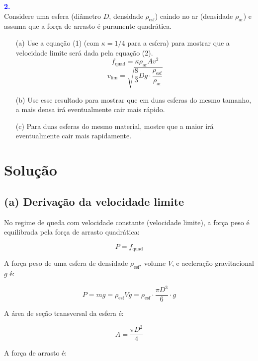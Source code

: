 \documentclass[a4paper,12pt]{article}
\begin{document}
\begin{flushleft}
\textbf{\textcolor{blue}{\Large \textbf{2.}}}\\
\noindent
Considere uma esfera (diâmetro \( D \), densidade \( \rho_{\text{esf}} \)) caindo no ar (densidade \( \rho_{\text{ar}} \)) e assuma que a força de arrasto é puramente quadrática.

\begin{enumerate}
    \item[(a)] Use a equação (1) (com \( \kappa = 1/4 \) para a esfera) para mostrar que a velocidade limite será dada pela equação (2).
    \[
    f_{\text{quad}} = \kappa \rho_{\text{ar}} A v^2 \tag{1}
    \]
    \[
    v_{\text{lim}} = \sqrt{ \frac{8}{3} D g \cdot \frac{\rho_{\text{esf}}}{\rho_{\text{ar}}} } \tag{2}
    \]

    \item[(b)] Use esse resultado para mostrar que em duas esferas do mesmo tamanho, a mais densa irá eventualmente cair mais rápido.

    \item[(c)] Para duas esferas do mesmo material, mostre que a maior irá eventualmente cair mais rapidamente.
\end{enumerate}

\vspace{0.5cm}
\section*{Solução}

\subsection*{(a) \colorbox{yellow!20}{Derivação da velocidade limite}}

No regime de queda com velocidade constante (velocidade limite), a força peso é equilibrada pela força de arrasto quadrática:

\[
\boxed{
P = f_{\text{quad}}
}
\]

A força peso de uma esfera de densidade \( \rho_{\text{esf}} \), volume \( V \), e aceleração gravitacional \( g \) é:

\[
P = m g = \rho_{\text{esf}} V g = \rho_{\text{esf}} \cdot \frac{\pi D^3}{6} \cdot g
\]

A área de seção transversal da esfera é:

\[
A = \frac{\pi D^2}{4}
\]

A força de arrasto é:


\end{flushleft}
\end{document}
